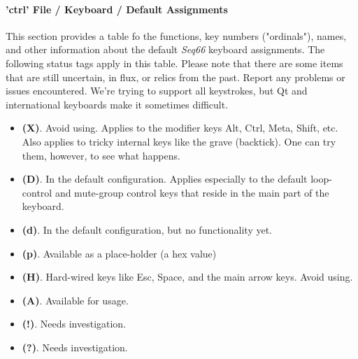%
%
%

\paragraph{'ctrl' File / Keyboard / Default Assignments}
\label{paragraph:ctrl_keyboard_default_assignments}

This section provides a table fo the functions, key numbers ("ordinals"),
names, and other information about the default \textsl{Seq66}
keyboard assignments.
The following status tags apply in this table.
Please note that there are some items that are still uncertain, in flux, or
relics from the past.  Report any problems or issues encountered.
We're trying to support all keystrokes, but Qt and international keyboards make
it sometimes difficult.

   \begin{itemize}
      \item \textbf{(X)}.
         Avoid using.  Applies to the modifier keys Alt, Ctrl, Meta, Shift, etc.
         Also applies to tricky internal keys like the grave (backtick).
         One can try them, however, to see what happens.
      \item \textbf{(D)}.
         In the default configuration. Applies especially to the default
         loop-control and mute-group control keys that reside in the main part of
         the keyboard.
      \item \textbf{(d)}.
         In the default configuration, but no functionality yet.
      \item \textbf{(p)}.
         Available as a place-holder (a hex value)
      \item \textbf{(H)}.
         Hard-wired keys like Esc, Space, and the main arrow keys.  Avoid using.
      \item \textbf{(A)}.
         Available for usage.
      \item \textbf{(!)}.
         Needs investigation.
      \item \textbf{(?)}.
         Needs investigation.
   \end{itemize}


